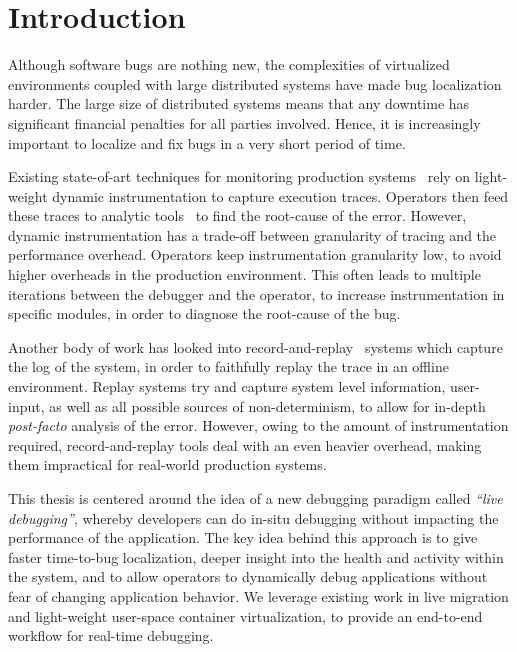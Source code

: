 \chapter{Introduction}
\label{section:intro}

Although software bugs are nothing new, the complexities of virtualized environments coupled with large distributed systems have made bug localization harder.
The large size of distributed systems means that any downtime has significant financial penalties for all parties involved.
Hence, it is increasingly important to localize and fix bugs in a very short period of time.

Existing state-of-art techniques for monitoring production systems~\cite{dtrace,winetw,systemtap} rely on light-weight dynamic instrumentation to capture execution traces.
Operators then feed these traces to analytic tools~\cite{magpie,clue} to find the root-cause of the error.
However, dynamic instrumentation has a trade-off between granularity of tracing and the performance overhead.
Operators keep instrumentation granularity low, to avoid higher overheads in the production environment.
This often leads to multiple iterations between the debugger and the operator, to increase instrumentation in specific modules, in order to diagnose the root-cause of the bug.

Another body of work has looked into record-and-replay~\cite{odr,revirt,laadan2010transparent,geels2007friday} systems which capture the log of the system, in order to faithfully replay the trace in an offline environment.
Replay systems try and capture system level information, user-input, as well as all possible sources of non-determinism, to allow for in-depth \textit{post-facto} analysis of the error.
However, owing to the amount of instrumentation required, record-and-replay tools deal with an even heavier overhead, making them impractical for real-world production systems.

This thesis is centered around the idea of a new debugging paradigm called \emph{``live debugging''}, whereby developers can do in-situ debugging without impacting the performance of the application.
The key idea behind this approach is to give faster time-to-bug localization, deeper insight into the health and activity within the system, and to allow operators to dynamically debug applications without fear of changing application behavior.
We leverage existing work in live migration and light-weight user-space container virtualization, to provide an end-to-end workflow for real-time debugging.

